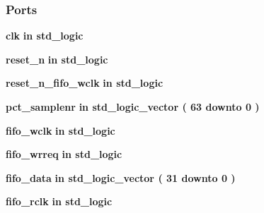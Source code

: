 \subsubsection*{Ports}
 \begin{DoxyCompactItemize}
\item 
{\bf clk}  {\bfseries {\bfseries \textcolor{keywordflow}{in}\textcolor{vhdlchar}{ }}} {\bfseries \textcolor{comment}{std\+\_\+logic}\textcolor{vhdlchar}{ }} 
\item 
{\bf reset\+\_\+n}  {\bfseries {\bfseries \textcolor{keywordflow}{in}\textcolor{vhdlchar}{ }}} {\bfseries \textcolor{comment}{std\+\_\+logic}\textcolor{vhdlchar}{ }} 
\item 
{\bf reset\+\_\+n\+\_\+fifo\+\_\+wclk}  {\bfseries {\bfseries \textcolor{keywordflow}{in}\textcolor{vhdlchar}{ }}} {\bfseries \textcolor{comment}{std\+\_\+logic}\textcolor{vhdlchar}{ }} 
\item 
{\bf pct\+\_\+samplenr}  {\bfseries {\bfseries \textcolor{keywordflow}{in}\textcolor{vhdlchar}{ }}} {\bfseries \textcolor{comment}{std\+\_\+logic\+\_\+vector}\textcolor{vhdlchar}{ }\textcolor{vhdlchar}{(}\textcolor{vhdlchar}{ }\textcolor{vhdlchar}{ } \textcolor{vhdldigit}{63} \textcolor{vhdlchar}{ }\textcolor{keywordflow}{downto}\textcolor{vhdlchar}{ }\textcolor{vhdlchar}{ } \textcolor{vhdldigit}{0} \textcolor{vhdlchar}{ }\textcolor{vhdlchar}{)}\textcolor{vhdlchar}{ }} 
\item 
{\bf fifo\+\_\+wclk}  {\bfseries {\bfseries \textcolor{keywordflow}{in}\textcolor{vhdlchar}{ }}} {\bfseries \textcolor{comment}{std\+\_\+logic}\textcolor{vhdlchar}{ }} 
\item 
{\bf fifo\+\_\+wrreq}  {\bfseries {\bfseries \textcolor{keywordflow}{in}\textcolor{vhdlchar}{ }}} {\bfseries \textcolor{comment}{std\+\_\+logic}\textcolor{vhdlchar}{ }} 
\item 
{\bf fifo\+\_\+data}  {\bfseries {\bfseries \textcolor{keywordflow}{in}\textcolor{vhdlchar}{ }}} {\bfseries \textcolor{comment}{std\+\_\+logic\+\_\+vector}\textcolor{vhdlchar}{ }\textcolor{vhdlchar}{(}\textcolor{vhdlchar}{ }\textcolor{vhdlchar}{ } \textcolor{vhdldigit}{31} \textcolor{vhdlchar}{ }\textcolor{keywordflow}{downto}\textcolor{vhdlchar}{ }\textcolor{vhdlchar}{ } \textcolor{vhdldigit}{0} \textcolor{vhdlchar}{ }\textcolor{vhdlchar}{)}\textcolor{vhdlchar}{ }} 
\item 
{\bf fifo\+\_\+rclk}  {\bfseries {\bfseries \textcolor{keywordflow}{in}\textcolor{vhdlchar}{ }}} {\bfseries \textcolor{comment}{std\+\_\+logic}\textcolor{vhdlchar}{ }} 
\item 

\end{DoxyCompactItemize}
